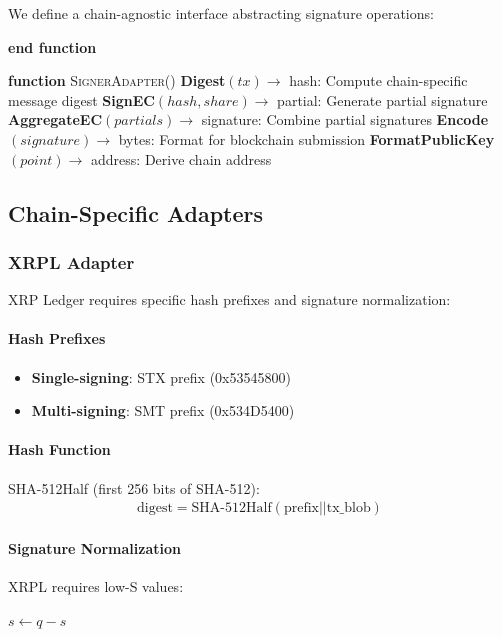 \documentclass[11pt,twocolumn]{article}
\begin{document}
We define a chain-agnostic interface abstracting signature operations:

\State \textbf{end function}
\begin{algorithmic}[1]
\State \textbf{function} \textsc{SignerAdapter}()
\State \textbf{Digest}$(tx) \to$ hash: Compute chain-specific message digest
\State \textbf{SignEC}$(hash, share) \to$ partial: Generate partial signature
\State \textbf{AggregateEC}$(partials) \to$ signature: Combine partial signatures
\State \textbf{Encode}$(signature) \to$ bytes: Format for blockchain submission
\State \textbf{FormatPublicKey}$(point) \to$ address: Derive chain address

\end{algorithmic}

\subsection{Chain-Specific Adapters}

\subsubsection{XRPL Adapter}

XRP Ledger requires specific hash prefixes and signature normalization:

\paragraph{Hash Prefixes}
\begin{itemize}
\item \textbf{Single-signing}: STX prefix (0x53545800)
\item \textbf{Multi-signing}: SMT prefix (0x534D5400)
\end{itemize}

\paragraph{Hash Function} SHA-512Half (first 256 bits of SHA-512):
\begin{align*}
\text{digest} = \text{SHA-512Half}(\text{prefix} || \text{tx\_blob})
\end{align*}

\paragraph{Signature Normalization} XRPL requires low-S values:
\begin{algorithmic}[1]
    \State $s \leftarrow q - s$
\EndIf
\end{algorithmic}
\end{document}

